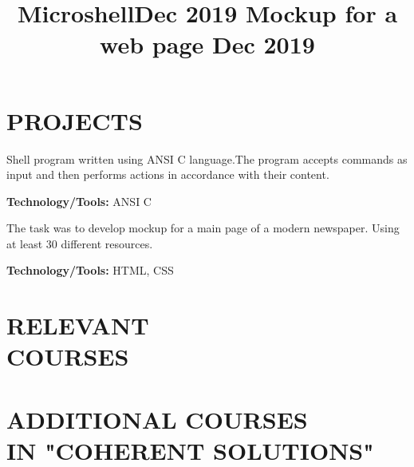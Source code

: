 \documentclass[margin]{res}
\begin{document}
\begin{resume}
\section{PROJECTS}
\title{\textbf{Microshell\hfill Dec 2019}
 }
\begin{position}
Shell program written using ANSI C language.The program accepts  commands as input and then performs actions in accordance with their content. 
\item \textbf{Technology/Tools:} ANSI C
\end{position}


\title{\textbf{Mockup for a web page \hfill Dec 2019}
 }
\begin{position}
The task was to develop mockup for a main page of a modern newspaper. Using at least 30 different resources.
\item \textbf{Technology/Tools:} HTML, CSS
\end{position}


\section{RELEVANT\\COURSES}
\par


\section{ADDITIONAL COURSES\\IN "COHERENT SOLUTIONS"}




\end{resume}
\(\)
\end{document}
